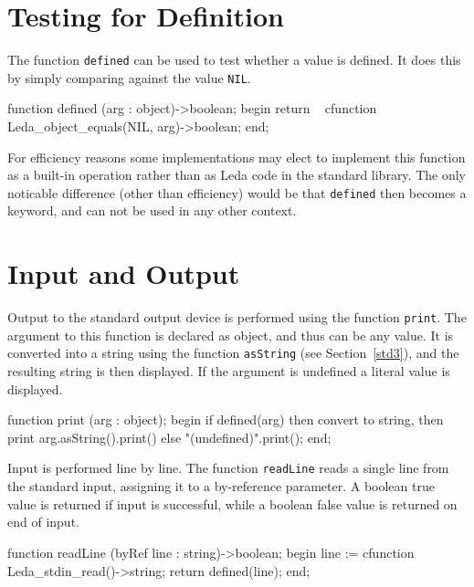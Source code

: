\section{Testing for Definition}

The function {\tt defined} can be used to test whether a value is
defined.  It does this by simply comparing against the value {\tt NIL}.

\begin{cprog}

function defined (arg : object)->boolean;
begin
	return ~ cfunction Leda_object_equals(NIL, arg)->boolean;
end;

\end{cprog}

For efficiency reasons some implementations may elect to implement
this function as a built-in operation rather than as Leda code in the
standard library.
The only noticable difference (other than efficiency) would be that
{\tt defined} then becomes a keyword, and can not be used in any other
context.

\section{Input and Output}\label{std1}

Output to the standard output device is performed using
the function {\tt print}.  The argument to this function is declared
as object, and thus can be any value.  It is converted into a string
using the function {\tt asString} (see Section~\ref{std3}), and
the resulting string is then displayed.  If the argument is undefined
a literal value is displayed.

\begin{cprog}

function print (arg : object);
begin
	if defined(arg) then
			{ convert to string, then print }
		arg.asString().print()
	else
		"(undefined)".print();
end;

\end{cprog}

Input is performed line by line.  The function {\tt readLine} reads
a single line from the standard input, assigning it to a by-reference
parameter.  A boolean true value is returned if input is successful,
while a boolean false value is returned on end of input.

\begin{cprog}

function readLine (byRef line : string)->boolean;
begin
	line := cfunction Leda_stdin_read()->string;
	return defined(line);
end;

\end{cprog}

